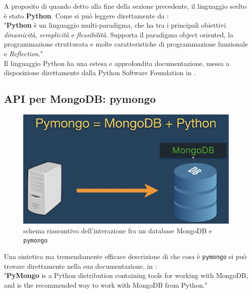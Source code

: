     A proposito di quando detto alla fine della sezione precedente, il linguaggio scelto è stato \textbf{Python}. Come si può leggere direttamente da \cite{pywiki}:\\

    "\textbf{Python} è un linguaggio multi-paradigma, che ha tra i principali obiettivi \textit{dinamicità}, \textit{semplicità} e \textit{flessibilità}. Supporta il paradigma object oriented, la programmazione strutturata e molte caratteristiche di programmazione funzionale e \textit{Reflection}." \\

    Il linguaggio Python ha una estesa e approfondita documentazione, messa a disposizione direttamente dalla Python Software Foundation in \cite{python}.

    \subsection{API per MongoDB: pymongo}

        \begin{figure}
            \centering
            \caption{schema riassuntivo dell'interazione fra un database MongoDB e \texttt{pymongo}}
            \label{pymongo_logo}
    	    \includegraphics[scale=0.70]{img/pymongo.png}
        \end{figure}

        Una sintetica ma tremendamente efficace descrizione di che cosa è \texttt{pymongo} si può trovare direttamente nella sua documentazione, in \cite{pymongo}:\\

        "\textbf{PyMongo} is a Python distribution containing tools for working with MongoDB, and is the recommended way to work with MongoDB from Python." \\

